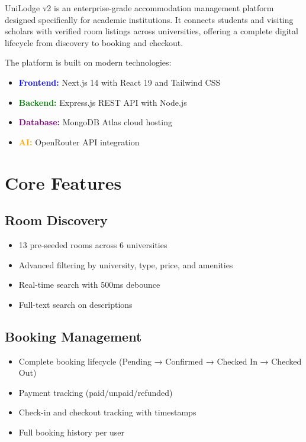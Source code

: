 \documentclass[12pt, a4paper, oneside]{report}
\begin{document}
\begin{tcolorbox}[highlight, title=Platform Summary]
UniLodge v2 is an enterprise-grade accommodation management platform designed specifically for academic institutions. It connects students and visiting scholars with verified room listings across universities, offering a complete digital lifecycle from discovery to booking and checkout.
\end{tcolorbox}

The platform is built on modern technologies:
\begin{itemize}
  \item \textcolor{Blue}{\textbf{Frontend:}} Next.js 14 with React 19 and Tailwind CSS
  \item \textcolor{Green}{\textbf{Backend:}} Express.js REST API with Node.js
  \item \textcolor{Purple}{\textbf{Database:}} MongoDB Atlas cloud hosting
  \item \textcolor{Orange}{\textbf{AI:}} OpenRouter API integration
\end{itemize}

\section{Core Features}

\subsection{Room Discovery}
\begin{itemize}
  \item 13 pre-seeded rooms across 6 universities
  \item Advanced filtering by university, type, price, and amenities
  \item Real-time search with 500ms debounce
  \item Full-text search on descriptions
\end{itemize}

\subsection{Booking Management}
\begin{itemize}
  \item Complete booking lifecycle (Pending → Confirmed → Checked In → Checked Out)
  \item Payment tracking (paid/unpaid/refunded)
  \item Check-in and checkout tracking with timestamps
  \item Full booking history per user
\end{itemize}
\end{document}
